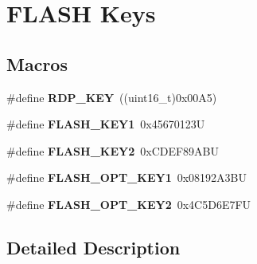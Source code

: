 \hypertarget{group___f_l_a_s_h___keys}{}\section{F\+L\+A\+SH Keys}
\label{group___f_l_a_s_h___keys}
\subsection*{Macros}
\begin{DoxyCompactItemize}
\item 
\mbox{\label{group___f_l_a_s_h___keys_gae497135e5528d69274bf8daf7f077f23}} 
\#define {\bfseries R\+D\+P\+\_\+\+K\+EY}~((uint16\+\_\+t)0x00\+A5)
\item 
\mbox{\label{group___f_l_a_s_h___keys_gafd77e7bf91765d891ce63e2f0084b019}} 
\#define {\bfseries F\+L\+A\+S\+H\+\_\+\+K\+E\+Y1}~0x45670123U
\item 
\mbox{\label{group___f_l_a_s_h___keys_gaee83d0f557e158da52f4a205db6b60a7}} 
\#define {\bfseries F\+L\+A\+S\+H\+\_\+\+K\+E\+Y2}~0x\+C\+D\+E\+F89\+A\+BU
\item 
\mbox{\label{group___f_l_a_s_h___keys_gacebe54ff9ff12abcf0e4d3e697b2f116}} 
\#define {\bfseries F\+L\+A\+S\+H\+\_\+\+O\+P\+T\+\_\+\+K\+E\+Y1}~0x08192\+A3\+BU
\item 
\mbox{\label{group___f_l_a_s_h___keys_ga636d46db38e376f0483eed4b7346697c}} 
\#define {\bfseries F\+L\+A\+S\+H\+\_\+\+O\+P\+T\+\_\+\+K\+E\+Y2}~0x4\+C5\+D6\+E7\+FU
\end{DoxyCompactItemize}


\subsection{Detailed Description}
